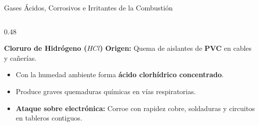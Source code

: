 \begin{frame}{Gases Ácidos, Corrosivos e Irritantes de la Combustión}
  \begin{columns}[T]
    \begin{column}{0.48\textwidth}
      \begin{block}{\textbf{Cloruro de Hidrógeno ($HCl$)}}
        \footnotesize
        \textbf{Origen:} Quema de aislantes de \textbf{PVC} en cables y cañerías.
        \vspace{0.05cm}
        \begin{itemize}
          \scriptsize
          \setlength{\itemsep}{3pt}
          \item Con la humedad ambiente forma \textbf{ácido clorhídrico concentrado}.
          \item Produce graves quemaduras químicas en vías respiratorias.
          \item \textbf{Ataque sobre electrónica:} Corroe con rapidez cobre, soldaduras y circuitos en tableros contiguos.
        \end{itemize}
      \end{block}
      \vspace{0.15cm}
      \centering
    \end{column}


\end{columns}
\end{frame}
